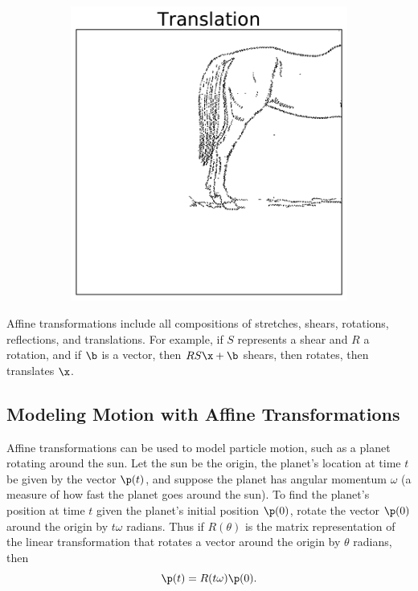 \begin{figure}[H]
\begin{subfigure}{.32\textwidth}
    \includegraphics[width=\linewidth]{figures/TranslationHorse.pdf}
\end{subfigure}
\end{figure}

Affine transformations include all compositions of stretches, shears, rotations, reflections, and translations.
For example, if $S$ represents a shear and $R$ a rotation, and if $\b$ is a vector, then $RS\x + \b$ shears, then rotates, then translates $\x$.

\subsection*{Modeling Motion with Affine Transformations} %

Affine transformations can be used to model particle motion, such as a planet rotating around the sun.
Let the sun be the origin, the planet's location at time $t$ be given by the vector $\p(t)$, and suppose the planet has angular momentum $\omega$ (a measure of how fast the planet goes around the sun).
To find the planet's position at time $t$ given the planet's initial position $\p(0)$, rotate the vector $\p(0)$ around the origin by $t\omega$ radians.
Thus if $R(\theta)$ is the matrix representation of the linear transformation that rotates a vector around the origin by $\theta$ radians, then \[\p(t) = R(t\omega)\p(0).\]

